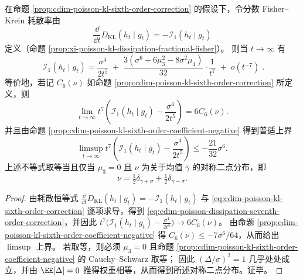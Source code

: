 \begin{corollary}[熵耗散率的七次校正项]\label{cor:cdim-poisson-kl-dissipation-seventh-order-correction}
在命题 \ref{prop:cdim-poisson-kl-sixth-order-correction} 的假设下，令分数 Fisher--Krein 耗散率由
\[
\frac{\dd}{\dd t}D_{\mathrm{KL}}(h_t\mid g_t)=-\mathcal I_1(h_t\mid g_t)
\]
定义（命题 \ref{prop:xi-poisson-kl-dissipation-fractional-fisher}）。
则当 \(t\to\infty\) 有
\begin{equation}\label{eq:cdim-poisson-dissipation-seventh-order-correction}
\boxed{\;
\mathcal I_1(h_t\mid g_t)
=\frac{\sigma^4}{2t^5}
\;+\;
\frac{3(\sigma^6+6\mu_3^2-8\sigma^2\mu_4)}{32}\cdot\frac{1}{t^7}
\;+\;o(t^{-7})\; }.
\end{equation}
等价地，若记 \(C_6(\nu)\) 如命题 \ref{prop:cdim-poisson-kl-sixth-order-correction} 所定义，则
\[
\lim_{t\to\infty}t^{7}\left(\mathcal I_1(h_t\mid g_t)-\frac{\sigma^4}{2t^5}\right)=6C_6(\nu).
\]
并且由命题 \ref{prop:cdim-poisson-kl-sixth-order-coefficient-negative} 得到普适上界
\[
\limsup_{t\to\infty}t^{7}\left(\mathcal I_1(h_t\mid g_t)-\frac{\sigma^4}{2t^5}\right)\le -\frac{21}{32}\sigma^6.
\]
上述不等式取等当且仅当 \(\mu_3=0\) 且 \(\nu\) 为关于均值 \(\bar\gamma\) 的对称二点分布，即
\[
\nu=\tfrac12\delta_{\bar\gamma+\sigma}+\tfrac12\delta_{\bar\gamma-\sigma}.
\]
\end{corollary}
\begin{proof}
由耗散恒等式
\(
\frac{\dd}{\dd t}D_{\mathrm{KL}}(h_t\mid g_t)=-\mathcal I_1(h_t\mid g_t)
\)
与 \eqref{eq:cdim-poisson-kl-sixth-order-correction} 逐项求导，得到 \eqref{eq:cdim-poisson-dissipation-seventh-order-correction}，并因此
\(
t^{7}\bigl(\mathcal I_1(h_t\mid g_t)-\frac{\sigma^4}{2t^5}\bigr)\to 6C_6(\nu)
\)。
由命题 \ref{prop:cdim-poisson-kl-sixth-order-coefficient-negative} 得 \(C_6(\nu)\le -7\sigma^6/64\)，从而给出 \(\limsup\) 上界。
若取等，则必须 \(\mu_3=0\) 且命题 \ref{prop:cdim-poisson-kl-sixth-order-coefficient-negative} 的 Cauchy--Schwarz 取等；
因此 \((\Delta/\sigma)^2=1\) 几乎处处成立，并由 \(\EE[\Delta]=0\) 推得权重相等，从而得到所述对称二点分布。证毕。
\end{proof}

